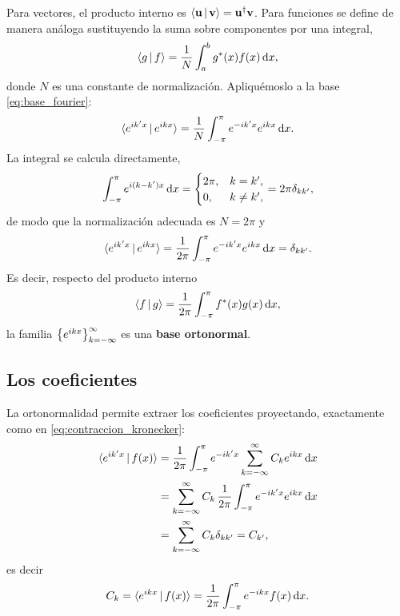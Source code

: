 Para vectores, el producto interno es
$\langle \mathbf{u} \,\vert\, \mathbf{v} \rangle=\mathbf{u}^\dagger\mathbf{v}$. Para funciones se define de
manera an\'aloga sustituyendo la suma sobre componentes por una integral,
\begin{equation}
  \label{eq:pi_funciones}
  \langle g \,\vert\, f \rangle=\frac{1}{N}\int_{a}^{b}g^{*}(x)f(x)\,\mathrm{d} x,
\end{equation}
donde $N$ es una constante de normalizaci\'on. Apliqu\'emoslo a la base
\eqref{eq:base_fourier}:
\begin{equation}
  \label{eq:pi_exponenciales}
  \langle e^{ik'x} \,\vert\, e^{ikx} \rangle
    =\frac{1}{N}\int_{-\pi}^{\pi}e^{-ik'x}e^{ikx}\,\mathrm{d} x .
\end{equation}
La integral se calcula directamente,
\begin{equation}
  \label{eq:integral_ortogonalidad}
  \int_{-\pi}^{\pi}e^{i(k-k')x}\,\mathrm{d} x=
  \begin{cases}
    2\pi, & k=k',\\
    0, & k\neq k',
  \end{cases}
  =2\pi\delta_{kk'},
\end{equation}
de modo que la normalizaci\'on adecuada es $N=2\pi$ y
\begin{equation}
  \label{eq:ortonormalidad_fourier}
  \langle e^{ik'x} \,\vert\, e^{ikx} \rangle
    =\frac{1}{2\pi}\int_{-\pi}^{\pi}e^{-ik'x}e^{ikx}\,\mathrm{d} x=\delta_{kk'} .
\end{equation}
Es decir, respecto del producto interno
\begin{equation}
  \label{eq:pi_fourier}
  \langle f \,\vert\, g \rangle=\frac{1}{2\pi}\int_{-\pi}^{\pi}f^{*}(x)g(x)\,\mathrm{d} x,
\end{equation}
la familia $\left\{ e^{ikx} \right\}_{k=-\infty}^{\infty}$ es una \textbf{base
ortonormal}.

\subsection{Los coeficientes}
\label{subsec:coeficientes_fourier}

La ortonormalidad permite extraer los coeficientes proyectando, exactamente
como en \eqref{eq:contraccion_kronecker}:
\begin{equation}
  \label{eq:extraccion_coeficientes}
  \begin{aligned}
    \langle e^{ik'x} \,\vert\, f(x) \rangle
      &=\frac{1}{2\pi}\int_{-\pi}^{\pi}e^{-ik'x}
        \sum_{k=-\infty}^{\infty}C_ke^{ikx}\,\mathrm{d} x\\
      &=\sum_{k=-\infty}^{\infty}C_k\,
        \frac{1}{2\pi}\int_{-\pi}^{\pi}e^{-ik'x}e^{ikx}\,\mathrm{d} x\\
      &=\sum_{k=-\infty}^{\infty}C_k\delta_{kk'}=C_{k'} ,
  \end{aligned}
\end{equation}
es decir
\begin{equation}
  \label{eq:coeficientes_fourier}
  C_k=\langle e^{ikx} \,\vert\, f(x) \rangle
    =\frac{1}{2\pi}\int_{-\pi}^{\pi}e^{-ikx}f(x)\,\mathrm{d} x .
\end{equation}

